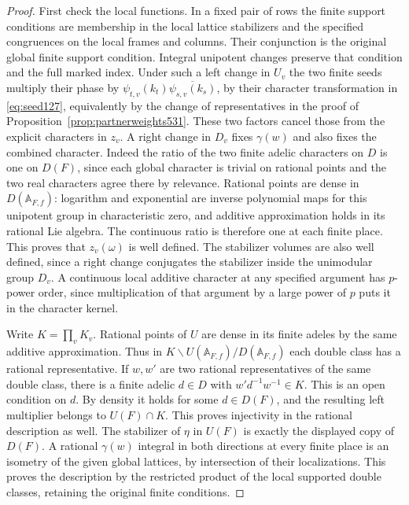 \documentclass[a4paper,11pt]{article}
\theoremstyle{definition}
\theoremstyle{remark}
\numberwithin{equation}{section}
\begin{document}
\begin{proof}
First check the local functions. In a fixed pair of rows the
finite support conditions are membership in the local lattice
stabilizers and the specified congruences on the local frames
and columns. Their conjunction is the original global finite
support condition. Integral unipotent changes preserve that
condition and the full marked index. Under such a left change
in \(U_v\) the two finite seeds multiply their phase by
\(\psi_{t,v}(k_t)\overline{\psi_{s,v}(k_s)}\), by their
character transformation in \eqref{eq:seed127}, equivalently
by the change of representatives in the proof of
Proposition~\ref{prop:partnerweights531}. These two factors
cancel those from the explicit characters in \(z_v\).
A right change in \(D_v\) fixes \(\gamma(w)\) and also fixes
the combined character. Indeed the ratio of the two finite
adelic characters on \(D\) is one on \(D(F)\), since each
global character is trivial on rational points and the two
real characters agree there by relevance. Rational points
are dense in \(D(\mathbb A_{F,f})\): logarithm and exponential
are inverse polynomial maps for this unipotent group in
characteristic zero, and additive approximation holds in its
rational Lie algebra. The continuous ratio is therefore one
at each finite place. This proves that \(z_v(\omega)\) is
well defined. The stabilizer volumes are also well defined,
since a right change conjugates the stabilizer inside the
unimodular group \(D_v\). A continuous local additive character
at any specified argument has \(p\)-power order, since
multiplication of that argument by a large power of \(p\)
puts it in the character kernel.

Write \(K=\prod_vK_v\). Rational points of \(U\) are dense
in its finite adeles by the same additive approximation.
Thus in \(K\backslash U(\mathbb A_{F,f})/D(\mathbb A_{F,f})\)
each double class has a rational representative. If \(w,w'\)
are two rational representatives of the same double class,
there is a finite adelic \(d\in D\) with \(w'd^{-1}w^{-1}\in K\).
This is an open condition on \(d\). By density it holds for
some \(d\in D(F)\), and the resulting left multiplier belongs
to \(U(F)\cap K\). This proves injectivity in the rational
description as well. The stabilizer of \(\eta\) in \(U(F)\)
is exactly the displayed copy of \(D(F)\). A rational
\(\gamma(w)\) integral in both directions at every finite
place is an isometry of the given global lattices, by
intersection of their localizations. This proves the
description by the restricted product of the local supported
double classes, retaining the original finite conditions.


\end{proof}
\end{document}
